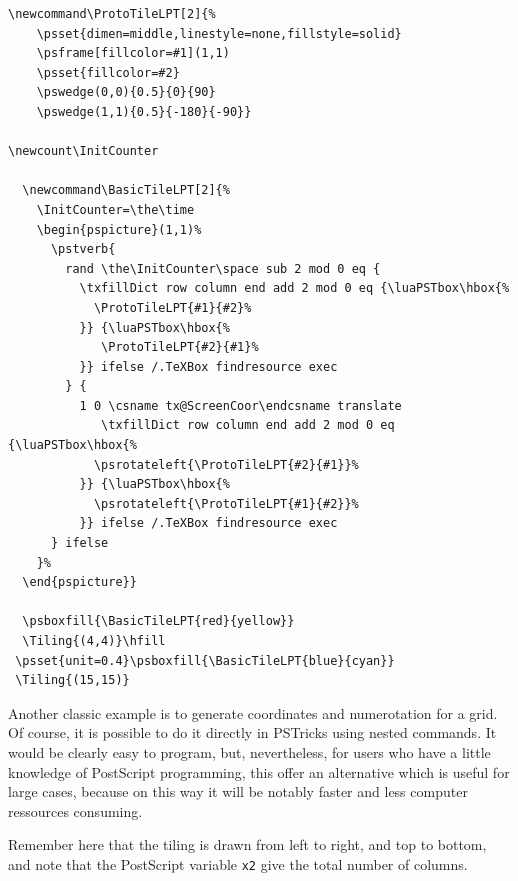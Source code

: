 \documentclass[fontsize=11pt,english,BCOR=10mm,DIV=12,bibliography=totoc,parskip=false,
   headings=small, headinclude=false,footinclude=false,oneside]{pst-doc}
\begin{document}
\begin{lstlisting}
\newcommand\ProtoTileLPT[2]{%
    \psset{dimen=middle,linestyle=none,fillstyle=solid}
    \psframe[fillcolor=#1](1,1)
    \psset{fillcolor=#2}
    \pswedge(0,0){0.5}{0}{90} 
    \pswedge(1,1){0.5}{-180}{-90}}
    
\newcount\InitCounter

  \newcommand\BasicTileLPT[2]{%
    \InitCounter=\the\time
    \begin{pspicture}(1,1)%
      \pstverb{
        rand \the\InitCounter\space sub 2 mod 0 eq {
          \txfillDict row column end add 2 mod 0 eq {\luaPSTbox\hbox{%
            \ProtoTileLPT{#1}{#2}%
          }} {\luaPSTbox\hbox{%
             \ProtoTileLPT{#2}{#1}%
          }} ifelse /.TeXBox findresource exec
        } {
          1 0 \csname tx@ScreenCoor\endcsname translate 
             \txfillDict row column end add 2 mod 0 eq {\luaPSTbox\hbox{%
            \psrotateleft{\ProtoTileLPT{#2}{#1}}%
          }} {\luaPSTbox\hbox{%
            \psrotateleft{\ProtoTileLPT{#1}{#2}}%
          }} ifelse /.TeXBox findresource exec
      } ifelse
    }%
  \end{pspicture}}

  \psboxfill{\BasicTileLPT{red}{yellow}}
  \Tiling{(4,4)}\hfill
 \psset{unit=0.4}\psboxfill{\BasicTileLPT{blue}{cyan}}
 \Tiling{(15,15)}
\end{lstlisting}


  Another classic example is to generate coordinates and numerotation for a
grid. Of course, it is possible to do it directly in PSTricks using nested
 commands. It would be clearly easy to program, but, nevertheless, 
for users who have a little knowledge of PostScript programming, this offer
an alternative which is useful for large cases, because on this way it will
be notably faster and less computer ressources consuming.

  Remember here that the tiling is drawn from left to right, and top to
bottom, and note that the PostScript variable \texttt{x2} give the total
number of columns.
\end{document}
